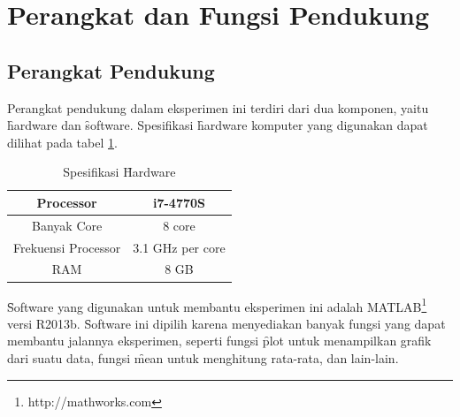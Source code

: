 \section{Perangkat dan Fungsi Pendukung}
  \subsection{Perangkat Pendukung}
  Perangkat pendukung dalam eksperimen ini terdiri dari dua komponen, yaitu \f{hardware} dan \f{software}. Spesifikasi \f{hardware} komputer yang digunakan dapat dilihat pada tabel \ref{table:spesifikasi hardware}.

  \begin{table}
    \centering
    \caption{Spesifikasi \f{Hardware}}
    \begin{tabular}{|c|c|}
      \hline
      Processor & i7-4770S \\ \hline
      Banyak Core & 8 core \\ \hline
      Frekuensi Processor & 3.1 GHz per core \\ \hline
      RAM & 8 GB \\ \hline
    \end{tabular}
    \label{table:spesifikasi hardware}
  \end{table}

   \f{Software} yang digunakan untuk membantu eksperimen ini adalah MATLAB\footnote{http://mathworks.com} versi R2013b. \f{Software} ini dipilih karena menyediakan banyak fungsi yang dapat membantu jalannya eksperimen, seperti fungsi \f{plot} untuk menampilkan grafik dari suatu data, fungsi \f{mean} untuk menghitung rata-rata, dan lain-lain.

